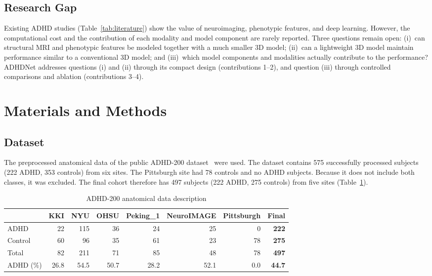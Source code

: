 \documentclass[runningheads]{llncs}
\begin{document}
\subsection{Research Gap}
Existing ADHD studies (Table~\ref{tab:literature}) show the value of neuroimaging, phenotypic features, and deep learning. However, the computational cost and the contribution of each modality and model component are rarely reported. Three questions remain open: (i)~can structural MRI and phenotypic features be modeled together with a much smaller 3D model; (ii)~can a lightweight 3D model maintain performance similar to a conventional 3D model; and (iii)~which model components and modalities actually contribute to the performance? ADHDNet addresses questions (i) and (ii) through its compact design (contributions 1--2), and question (iii) through controlled comparisons and ablation (contributions 3--4).

\section{Materials and Methods}

\subsection{Dataset}
The preprocessed anatomical data of the public ADHD-200 dataset~\cite{adhd200consortium2012,bellec2017} were used. The dataset contains 575 successfully processed subjects (222 ADHD, 353 controls) from six sites. The Pittsburgh site had 78 controls and no ADHD subjects. Because it does not include both classes, it was excluded. The final cohort therefore has 497 subjects (222 ADHD, 275 controls) from five sites (Table~\ref{tab:dataset}).

\begin{table}[!htb]
\centering
\caption{ADHD-200 anatomical data description}
\label{tab:dataset}
{\small
\setlength{\tabcolsep}{4.5 pt}
\begin{tabular}{lrrrrrrr}
\toprule
 & KKI & NYU & OHSU & Peking\_1 & NeuroIMAGE & Pittsburgh & \textbf{Final} \\
\midrule
ADHD & 22 & 115 & 36 & 24 & 25 & 0 & \textbf{222} \\
Control & 60 & 96 & 35 & 61 & 23 & 78 & \textbf{275} \\
Total & 82 & 211 & 71 & 85 & 48 & 78 & \textbf{497} \\
ADHD (\%) & 26.8 & 54.5 & 50.7 & 28.2 & 52.1 & 0.0 & \textbf{44.7} \\
\bottomrule
\end{tabular}}
\end{table}
\end{document}
